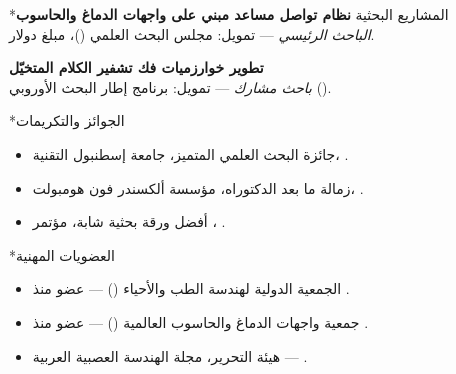 \documentclass[11pt,a4paper]{article}
\makeatletter
\let\oldsection\section
\renewcommand{\section}{\@ifstar{\sectionstar}{\oldsection}}
\newcommand{\sectionstar}[1]{\oldsection*{#1}\vspace{-0.6em}{\color{rule}\hrule height 0.4pt}\vspace{0.4em}}
\makeatother
\begin{document}
\section*{المشاريع البحثية}
\textbf{نظام تواصل مساعد مبني على واجهات الدماغ والحاسوب} \hfill {}\\
\textit{الباحث الرئيسي} — تمويل: مجلس البحث العلمي ()، مبلغ  دولار.

\vspace{0.4em}
\textbf{تطوير خوارزميات فك تشفير الكلام المتخيّل} \hfill {}\\
\textit{باحث مشارك} — تمويل: برنامج إطار البحث الأوروبي ().

\section*{الجوائز والتكريمات}
\begin{itemize}
\item جائزة البحث العلمي المتميز، جامعة إسطنبول التقنية، .
\item زمالة ما بعد الدكتوراه، مؤسسة ألكسندر فون هومبولت، .
\item أفضل ورقة بحثية شابة، مؤتمر ، .
\end{itemize}

\section*{العضويات المهنية}
\begin{itemize}
\item الجمعية الدولية لهندسة الطب والأحياء () — عضو منذ .
\item جمعية واجهات الدماغ والحاسوب العالمية () — عضو منذ .
\item هيئة التحرير، مجلة الهندسة العصبية العربية — .
\end{itemize}

\end{document}
